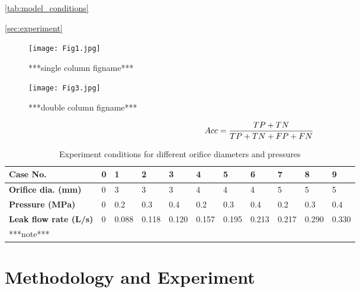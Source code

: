 \documentclass[a4paper,fleqn]{cas-dc}
\begin{document}
	\autoref{tab:model_conditions}
	
	\autoref{sec:experiment}
	
	\begin{figure}[htbp]
		\centering
		\texttt{[image: Fig1.jpg]}
		\caption{***single column figname***}
		\label{fig: principle}
	\end{figure}
	
	\begin{figure*}[htbp]
		\centering
		\texttt{[image: Fig3.jpg]}
		\caption{***double column figname***}
		\label{fig: principle2}
	\end{figure*}

	\begin{equation}
		Acc = {{TP+TN}\over{TP+TN+FP+FN}}
	\end{equation}
	
\renewcommand{\arraystretch}{1.2}  %
\begin{table*}[htbp]%
	\caption{Experiment conditions for different orifice diameters and pressures}
	\label{tab:model_conditions}
	\centering
	\begin{tabular*}{\textwidth}{@{\extracolsep{\fill}}lllllllllll}
		
		\toprule 
		\textbf{Case No.}             & \textbf{0} & \textbf{1} & \textbf{2} & \textbf{3} & \textbf{4} & \textbf{5} & \textbf{6} & \textbf{7} & \textbf{8} & \textbf{9} \\
		
		\midrule 
		\textbf{Orifice dia. (mm)}    & 0          & 3          & 3          & 3          & 4          & 4          & 4          & 5          & 5          & 5 \\
		
		\textbf{Pressure (MPa)}       & 0          & 0.2        & 0.3        & 0.4        & 0.2        & 0.3        & 0.4        & 0.2        & 0.3        & 0.4 \\
		
		\textbf{Leak flow rate (L/s)} & 0          & 0.088      & 0.118      & 0.120      & 0.157      & 0.195      & 0.213      & 0.217      & 0.290      & 0.330 \\
		
		\bottomrule
		\multicolumn{11}{l}{***note***} \\
	\end{tabular*}
\end{table*}

\section{Methodology and Experiment }
\end{document}
